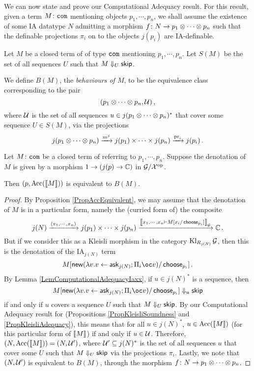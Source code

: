 \documentclass{report}[11pt]
\begin{document}
We can now state and prove our Computational Adequacy result.
For this result, given a term $M\colon {\mathtt{com}}$ mentioning objects $p_1,\cdots,p_n$, we shall assume the existence of some IA datatype $N$ admitting a morphism $f \colon N \to p_1 \otimes \cdots \otimes p_n$ such that the definable projections $\pi_i$ on to the objects $j(p_i)$ are IA-definable.

\begin{definition}
  Let $M$ be a closed term of \IAXX of type ${\mathtt{com}}$ mentioning $p_1,\cdots,p_n$.
  Let $S(M)$ be the set of all sequences $U$ such that $M\Downarrow_U{\mathsf{skip}}$.

  We define $B(M)$, the \emph{behaviours of $M$}, to be the equivalence class corresponding to the pair
  \[
    (p_1\otimes \cdots \otimes p_n, \mathcal U)\,,
    \]
  where $\mathcal U$ is the set of all sequences $u\in j(p_1\otimes \cdots \otimes p_n)^*$ that cover some sequence $U\in S(M)$, via the projections
  \[
    j(p_1\otimes \cdots \otimes p_n) \xrightarrow{m^j} j(p_1) \times \cdots \times j(p_n) \xrightarrow{\operatorname{pr}_i} j(p_i)\,.
    \]
\end{definition}


\begin{theorem}
  Let $M \colon {\mathtt{com}}$ be a closed term of \IAXX referring to $p_1,\cdots,p_n$.  
  Suppose the denotation of $M$ is given by a morphism $1 \to (j(p) \to \mathbb{C})$ in $\mathcal G/\mathcal X^{\mathrm{op}}$.  

  Then $(p,\operatorname{Acc}(\left\llbracket M\right\rrbracket))$ is equivalent to $B(M)$.
  \label{TheComputationalAdequacyIAXX}
\end{theorem}
\begin{proof}
  By Proposition \ref{PropAccEquivalent}, we may assume that the denotation of $M$ is in a particular form, namely the (curried form of) the composite
  \[
    j(N) \xrightarrow{\langle\pi_1,\cdots,\pi_n\rangle} j(p_1) \times \cdots \times j(p_n) \xrightarrow{\left\llbracket x_1,\cdots,x_n\mathbin{\vdash} M[x_i/\operatorname{\mathsf{choose}}_{p_i}]\right\rrbracket_\mathcal G} \mathbb{C}\,.
    \]
  But if we consider this as a Kleisli morphism in the category $\operatorname{Kl}_{R_{j(N)}}\mathcal G$, then this is the denotation of the IA${}_{j(N)}$ term
  \[
    M[\neww(\lambda v.v\gets \ask_{j(N)};\Pi_i\oc v)/\choose_{p_i}]\,.
    \]
  By Lemma \ref{LemComputationalAdequacyIaxx}, if $u\in j(N)^*$ is a sequence, then
  \[
    M[\neww(\lambda v.v\gets \ask_{j(N)};\Pi_i\oc v)/\choose_{p_i}]\converges_u \skipp
    \]
  if and only if $u$ covers a sequence $U$ such that $M\Downarrow_U{\mathsf{skip}}$.
  By our Computational Adequacy result for \IAX (Propositions \ref{PropKleisliSoundness} and \ref{PropKleisliAdequacy}), this means that for all $u\in j(N)^*$, $u\in \operatorname{Acc}(\left\llbracket M\right\rrbracket)$ (for this particular form of $\left\llbracket M\right\rrbracket$) if and only if $u\in \mathcal U$.
  Therefore, $(N,\operatorname{Acc}(\left\llbracket M\right\rrbracket)) = (N,\mathcal U')$, where $\mathcal U'\subseteq j(N)^*$ is the set of all sequences $u$ that cover some $U$ such that $M\Downarrow_U{\mathsf{skip}}$ via the projections $\pi_i$.
  Lastly, we note that $(N,\mathcal U')$ is equivalent to $B(M)$, through the morphism $f\colon N \to p_1\otimes\cdots\otimes p_n$.
\end{proof}
\end{document}
